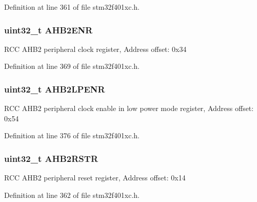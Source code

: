 Definition at line 361 of file stm32f401xc.\+h.

\subsubsection[{\texorpdfstring{A\+H\+B2\+E\+NR}{AHB2ENR}}]{ uint32\+\_\+t A\+H\+B2\+E\+NR}\hypertarget{struct_r_c_c___type_def_a5e92ed32c33c92e7ebf6919400ad535b}{}\label{struct_r_c_c___type_def_a5e92ed32c33c92e7ebf6919400ad535b}
R\+CC A\+H\+B2 peripheral clock register, Address offset\+: 0x34 

Definition at line 369 of file stm32f401xc.\+h.

\subsubsection[{\texorpdfstring{A\+H\+B2\+L\+P\+E\+NR}{AHB2LPENR}}]{ uint32\+\_\+t A\+H\+B2\+L\+P\+E\+NR}\hypertarget{struct_r_c_c___type_def_a2b30982547fae7d545d260312771b5c9}{}\label{struct_r_c_c___type_def_a2b30982547fae7d545d260312771b5c9}
R\+CC A\+H\+B2 peripheral clock enable in low power mode register, Address offset\+: 0x54 

Definition at line 376 of file stm32f401xc.\+h.

\subsubsection[{\texorpdfstring{A\+H\+B2\+R\+S\+TR}{AHB2RSTR}}]{ uint32\+\_\+t A\+H\+B2\+R\+S\+TR}\hypertarget{struct_r_c_c___type_def_a78a5aa9dd5694c48a7d8e66888a46450}{}\label{struct_r_c_c___type_def_a78a5aa9dd5694c48a7d8e66888a46450}
R\+CC A\+H\+B2 peripheral reset register, Address offset\+: 0x14 

Definition at line 362 of file stm32f401xc.\+h.

